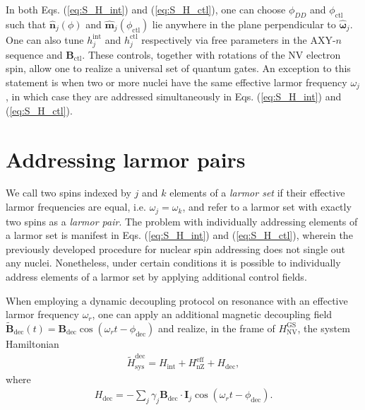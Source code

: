 \documentclass[twocolumn]{revtex4-1}
\renewcommand{\t}{\text} %
\newcommand{\p}[1]{\left(#1\right)} %
\renewcommand{\v}{\bm} %
\newcommand{\uv}[1]{\hat{\v{#1}}} %
\renewcommand{\c}{\cdot} %
\newcommand{\NV}{\t{NV}}
\begin{document}
In both Eqs. (\ref{eq:S_H_int}) and (\ref{eq:S_H_ctl}), one can choose
$\phi_{DD}$ and $\phi_{\t{ctl}}$ such that $\uv n_j\p\phi$ and
$\uv m_j\p{\phi_{\t{ctl}}}$ lie anywhere in the plane perpendicular to
$\uv\omega_j$. One can also tune $h_j^{\t{int}}$ and $h_j^{\t{ctl}}$
respectively via free parameters in the AXY-$n$ sequence and
$\v B_{\t{ctl}}$. These controls, together with rotations of the NV
electron spin, allow one to realize a universal set of quantum
gates. An exception to this statement is when two or more nuclei have
the same effective larmor frequency $\omega_j$, in which case they are
addressed simultaneously in Eqs. (\ref{eq:S_H_int}) and
(\ref{eq:S_H_ctl}).


\section{Addressing larmor pairs}
\label{sec:S_addressing_pairs}

We call two spins indexed by $j$ and $k$ elements of a \emph{larmor
  set} if their effective larmor frequencies are equal,
i.e. $\omega_j=\omega_k$, and refer to a larmor set with exactly two
spins as a \emph{larmor pair}. The problem with individually
addressing elements of a larmor set is manifest in
Eqs. (\ref{eq:S_H_int}) and (\ref{eq:S_H_ctl}), wherein the previously
developed procedure for nuclear spin addressing does not single out
any nuclei. Nonetheless, under certain conditions it is possible to
individually address elements of a larmor set by applying additional
control fields.

When employing a dynamic decoupling protocol on resonance with an
effective larmor frequency $\omega_r$, one can apply an additional
magnetic decoupling field
$\tilde{\v B}_{\t{dec}}\p{t}=\v B_{\t{dec}}\cos\p{\omega_r
  t-\phi_{\t{dec}}}$ and realize, in the frame of $H_\NV^{\t{GS}}$,
the system Hamiltonian
\begin{align}
  \tilde H_{\t{sys}}^{\t{dec}}
  = H_{\t{int}} + H_{\t{nZ}}^{\t{eff}} + H_{\t{dec}},
\end{align}
where
\begin{align}
  H_{\t{dec}} = -\sum_j\gamma_j\v B_{\t{dec}}\c\v I_j
  \cos\p{\omega_rt-\phi_{\t{dec}}}.
\end{align}
\end{document}
